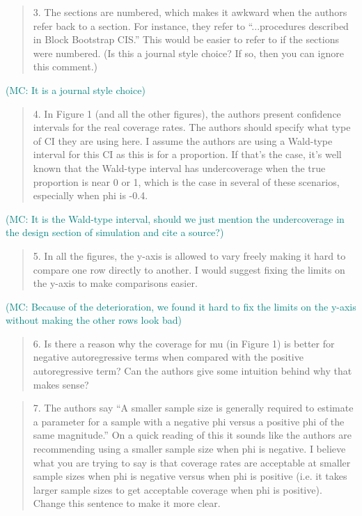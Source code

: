 \documentclass[12pt]{article}
\newcommand{\mc}[1]{\textcolor{teal}{(MC: #1)}}
\newenvironment{comment}%
{\begin{quotation}\noindent\small\it\color{darkblue}\ignorespaces%
}{\end{quotation}}
\begin{document}
\begin{comment}
3. The sections are numbered, which makes it awkward when the authors refer back 
to a section.  For instance, they refer to “...procedures described in Block 
Bootstrap CIS.”  This would be easier to refer to if the sections were numbered.  
(Is this a journal style choice?  If so, then you can ignore this comment.)
\end{comment}

\mc{It is a journal style choice}

\begin{comment}
4.  In Figure 1 (and all the other figures), the authors present confidence 
intervals for the real coverage rates.  The authors should specify what type of 
CI they are using here.  I assume the authors are using a Wald-type interval for 
this CI as this is for a proportion.  If that’s the case, it’s well known that 
the Wald-type interval has undercoverage when the true proportion is near 0 or 
1, which is the case in several of these scenarios, especially when phi is -0.4. 
\end{comment}

\mc{It is the Wald-type interval, should we just mention the undercoverage in
the design section of simulation and cite a source?}

\begin{comment}
5.  In all the figures, the y-axis is allowed to vary freely making it hard to 
compare one row directly to another.  I would suggest fixing the limits on the 
y-axis to make comparisons easier.  
\end{comment}

\mc{Because of the deterioration, we found it hard to fix the limits on the 
y-axis without making the other rows look bad}

\begin{comment}
6.  Is there a reason why the coverage for mu (in Figure 1) is better for 
negative autoregressive terms when compared with the positive autoregressive 
term? Can the authors give some intuition behind why that makes sense? 
\end{comment}



\begin{comment}
7.  The authors say “A smaller sample size is generally required to estimate a 
parameter for a sample with a negative phi versus a positive phi of the same 
magnitude.”  On a quick reading of this it sounds like the authors are 
recommending using a smaller sample size when phi is negative.  I believe what 
you are trying to say is that coverage rates are acceptable at smaller sample 
sizes when phi is negative versus when phi is positive (i.e. it takes larger 
sample sizes to get acceptable coverage when phi is positive).  Change this 
sentence to make it more clear. 
\end{comment}
\end{document}

